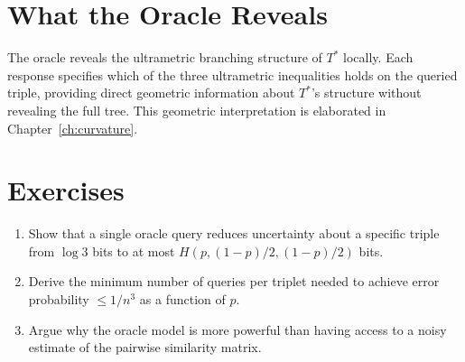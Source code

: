 \section{What the Oracle Reveals}

The oracle reveals the ultrametric branching structure of $T^*$ locally. Each response specifies which of the three ultrametric inequalities holds on the queried triple, providing direct geometric information about $T^*$'s structure without revealing the full tree. This geometric interpretation is elaborated in Chapter~\ref{ch:curvature}.

\section{Exercises}

\begin{enumerate}
  \item Show that a single oracle query reduces uncertainty about a specific triple from $\log 3$ bits to at most $H(p, (1-p)/2, (1-p)/2)$ bits.
  \item Derive the minimum number of queries per triplet needed to achieve error probability $\leq 1/n^3$ as a function of $p$.
  \item Argue why the oracle model is more powerful than having access to a noisy estimate of the pairwise similarity matrix.
\end{enumerate}
